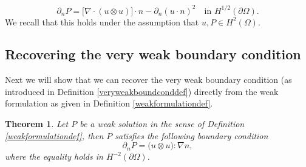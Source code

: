 \documentclass[12pt,a4paper]{article}
\newtheorem{theorem}{Theorem}[section]
\theoremstyle{definition}
\theoremstyle{remark}
\numberwithin{equation}{section}
\begin{document}
\begin{equation}
\partial_n P = \big[ \nabla \cdot (u \otimes u) \big] \cdot n - \partial_n (u \cdot n)^2 \quad \text{in } H^{1/2} (\partial \Omega).
\end{equation}
We recall that this holds under the assumption that $u , P \in H^2 (\Omega)$.
\subsection{Recovering the very weak boundary condition}
Next we will show that we can recover the very weak boundary condition (as introduced in Definition \ref{veryweakboundconddef}) directly from the weak formulation as given in Definition \ref{weakformulationdef}.
\begin{theorem} \label{veryweakboundcondthm}
Let $P$ be a weak solution in the sense of Definition \ref{weakformulationdef}, then $P$ satisfies the following boundary condition
\begin{equation}
\partial_n P = \big( u \otimes u \big) : \nabla n,
\end{equation}
where the equality holds in $H^{-2} (\partial \Omega)$.
\end{theorem}
\end{document}
